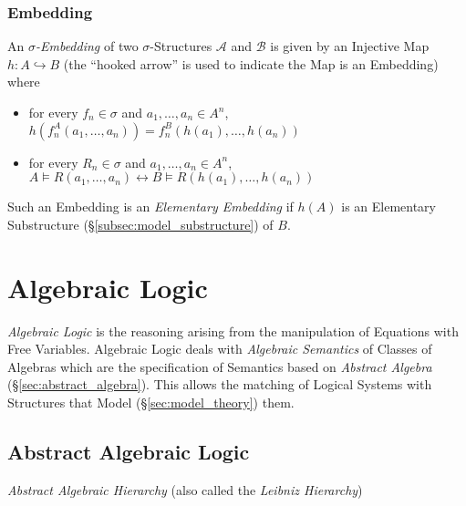 \documentclass{article}
\begin{document}
\subsubsection{Embedding}\label{subsec:sigma_embedding}

An \emph{$\sigma$-Embedding} of two $\sigma$-Structures $\mathcal{A}$
and $\mathcal{B}$ is given by an Injective Map $h: A \hookrightarrow
B$ (the ``hooked arrow'' is used to indicate the Map is an Embedding)
where
\begin{itemize}
\item for every $f_n \in \sigma$ and $a_1, \ldots, a_n \in A^n$,
  $h(f_{n}^A(a_1,\ldots,a_n)) = f_{n}^B(h(a_1),\ldots,h(a_n))$
\item for every $R_n \in \sigma$ and $a_1, \ldots, a_n \in A^n$, $A
  \vDash R(a_1, \ldots, a_n) \leftrightarrow B \vDash R(h(a_1),
  \ldots, h(a_n))$
\end{itemize}
Such an Embedding is an \emph{Elementary Embedding} if $h(A)$ is an
Elementary Substructure (\S\ref{subsec:model_substructure}) of $B$.

\section{Algebraic Logic}

\emph{Algebraic Logic} is the reasoning arising from the manipulation
of Equations with Free Variables. Algebraic Logic deals with
\emph{Algebraic Semantics} of Classes of Algebras which are the
specification of Semantics based on \emph{Abstract Algebra}
(\S\ref{sec:abstract_algebra}). This allows the matching of Logical
Systems with Structures that Model (\S\ref{sec:model_theory}) them.

\subsection{Abstract Algebraic Logic}

\emph{Abstract Algebraic Hierarchy} (also called the \emph{Leibniz Hierarchy})

\end{document}
